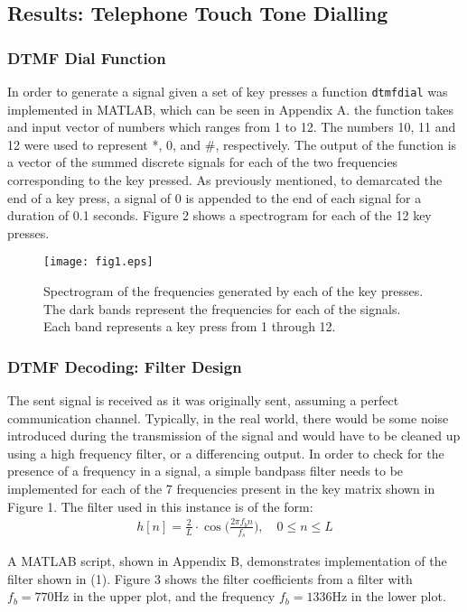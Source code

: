 \documentclass{article}
\begin{document}
\subsection{Results: Telephone Touch Tone Dialling}
\subsubsection{DTMF Dial Function}
In order to generate a signal given a set of key presses a function \verb|dtmfdial| was implemented in MATLAB, which can be seen in Appendix A. the function takes and input vector of numbers which ranges from 1 to 12. The numbers 10, 11 and 12 were used to represent *, 0, and \#, respectively. The output of the function is a vector of the summed discrete signals for each of the two frequencies corresponding to the key pressed. As previously mentioned, to demarcated the end of a key press, a signal of 0 is appended to the end of each signal for a duration of 0.1 seconds. Figure 2 shows a spectrogram for each of the 12 key presses.

\begin{figure}[H]
	\centering
	\texttt{[image: fig1.eps]}
	\caption{Spectrogram of the frequencies generated by each of the key presses. The dark bands represent the frequencies for each of the signals. Each band represents a key press from 1 through 12.}
\end{figure}

\subsubsection{DTMF Decoding: Filter Design}
The sent signal is received as it was originally sent, assuming a perfect communication channel. Typically, in the real world, there would be some noise introduced during the transmission of the signal and would have to be cleaned up using a high frequency filter, or a differencing output. In order to check for the presence of a frequency in a signal, a simple bandpass filter needs to be implemented for each of the 7 frequencies present in the key matrix shown in Figure 1. The filter used in this instance is of the form:
\begin{align}
	h[n] = \frac{2}{L} \cdot \cos \bigg(\frac{2 \pi f_b n}{f_s}\bigg), \quad 0 \leq n \leq L
\end{align}

A MATLAB script, shown in Appendix B, demonstrates implementation of the filter shown in (1). Figure 3 shows the filter coefficients from a filter with $f_b = 770 \si{\hertz}$ in the upper plot, and the frequency $f_b = 1336 \si{\hertz}$ in the lower plot. 
\end{document}
